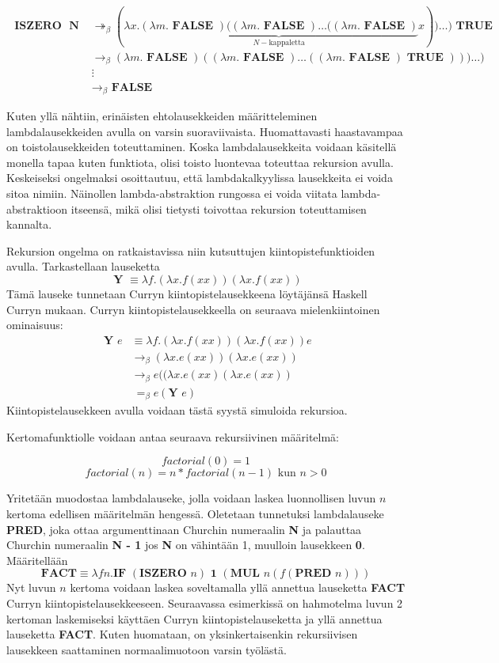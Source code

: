 \begin{align*}
\textbf{ ISZERO } \textbf{ N } &\twoheadrightarrow_{\beta} (\lambda x . \underbrace{ (\lambda m . \textbf{ FALSE }) ( (\lambda m . \textbf{ FALSE }) \ldots ((\lambda m . \textbf{ FALSE }) }_{ N-\text{kappaletta}} x)) \ldots ) \textbf{ TRUE } \\
&\rightarrow_{\beta}  (\lambda m . \textbf{ FALSE }) ( (\lambda m . \textbf{ FALSE }) \ldots ((\lambda m . \textbf{ FALSE }) \textbf{ TRUE }) )) \ldots ) \\
&\vdots \\
&\rightarrow_{\beta} \textbf{ FALSE }
\end{align*}
\par
Kuten yllä nähtiin, erinäisten ehtolausekkeiden määritteleminen lambdalausekkeiden avulla on varsin suoraviivaista. Huomattavasti haastavampaa on toistolausekkeiden toteuttaminen. Koska lambdalausekkeita voidaan käsitellä monella tapaa kuten funktiota, olisi toisto luontevaa toteuttaa rekursion avulla. Keskeiseksi ongelmaksi osoittautuu, että lambdakalkyylissa lausekkeita ei voida sitoa nimiin. Näinollen lambda-abstraktion rungossa ei voida viitata lambda-abstraktioon itseensä, mikä olisi tietysti toivottaa rekursion toteuttamisen kannalta. 
\par 
Rekursion ongelma on ratkaistavissa niin kutsuttujen kiintopistefunktioiden avulla. Tarkastellaan lauseketta 
\[ \textbf{ Y } \equiv \lambda f . (\lambda x . f(xx)) (\lambda x . f(xx)) \]
Tämä lauseke tunnetaan Curryn kiintopistelausekkeena löytäjänsä Haskell Curryn mukaan. Curryn kiintopistelausekkeella on seuraava mielenkiintoinen ominaisuus:
\begin{align*}
\textbf{ Y } e &\equiv \lambda f . (\lambda x . f(xx)) (\lambda x . f(xx)) e \\
&\rightarrow_{\beta} (\lambda x . e(xx)) (\lambda x . e(xx)) \\
&\rightarrow_{\beta} e((\lambda x . e(xx)(\lambda x . e(xx)) \\
&\ =_{\beta} e(\textbf{Y }e) 
\end{align*}
Kiintopistelausekkeen avulla voidaan tästä syystä simuloida rekursioa.

Kertomafunktiolle voidaan antaa seuraava rekursiivinen määritelmä:

\[factorial(0) = 1 \]
\[factorial(n) = n * factorial(n-1) \text{ kun } n > 0\]

Yritetään muodostaa lambdalauseke, jolla voidaan laskea luonnollisen luvun $n$ kertoma edellisen määritelmän hengessä. Oletetaan tunnetuksi lambdalauseke \textbf{PRED}, joka ottaa argumenttinaan Churchin numeraalin \textbf{N} ja palauttaa Churchin numeraalin \textbf{N - 1} jos \textbf{N} on vähintään 1, muulloin lausekkeen \textbf{0}. Määritellään
\[ \textbf{FACT} \equiv \lambda f n. \textbf{IF } (\textbf{ISZERO } n) \textbf{ 1 } (\textbf{MUL } n (f (\textbf{PRED } n))) \]
Nyt luvun $n$ kertoma voidaan laskea soveltamalla yllä annettua lauseketta \textbf{FACT} Curryn kiintopistelausekkeeseen. Seuraavassa esimerkissä on hahmotelma luvun 2 kertoman laskemiseksi käyttäen Curryn kiintopistelauseketta ja yllä annettua lauseketta \textbf{FACT}. Kuten huomataan, on yksinkertaisenkin rekursiivisen lausekkeen saattaminen normaalimuotoon varsin työlästä.  

